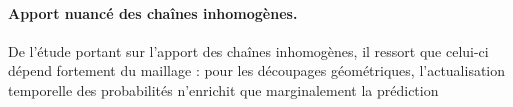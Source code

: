 \documentclass[french]{MemoireMaster}
\begin{document}
\paragraph{Apport nuancé des chaînes inhomogènes.}
De l'étude portant sur l'apport des chaînes inhomogènes, il ressort que celui-ci dépend fortement du maillage : pour les découpages géométriques, l'actualisation temporelle des probabilités n'enrichit que marginalement la prédiction


\end{document}
